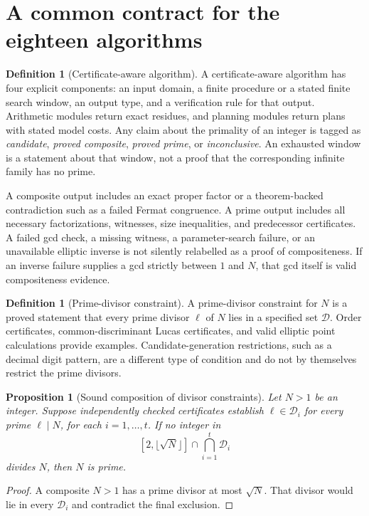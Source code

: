 \documentclass[11pt,a4paper]{article}
\newtheorem{proposition}[theorem]{Proposition}
\theoremstyle{definition}\newtheorem{definition}[theorem]{Definition}
\theoremstyle{remark}\newtheorem{remark}[theorem]{Remark}
\begin{document}
\section{A common contract for the eighteen algorithms}
\label{sec:algorithm-contract}

\begin{definition}[Certificate-aware algorithm]
A certificate-aware algorithm has four explicit components:
an input domain, a finite procedure or a stated finite search window,
an output type, and a verification rule for that output. Arithmetic modules
return exact residues, and planning modules return plans with stated model
costs. Any claim about the primality of an integer is tagged as
\emph{candidate}, \emph{proved composite}, \emph{proved prime}, or
\emph{inconclusive}. An exhausted window is a statement about that window,
not a proof that the corresponding infinite family has no prime.
\end{definition}

A composite output includes an exact proper factor or a theorem-backed
contradiction such as a failed Fermat congruence. A prime output includes
all necessary factorizations, witnesses, size inequalities, and predecessor
certificates. A failed gcd check, a missing witness, a parameter-search
failure, or an unavailable elliptic inverse is not silently relabelled as
a proof of compositeness. If an inverse failure supplies a gcd strictly
between $1$ and $N$, that gcd itself is valid compositeness evidence.

\begin{definition}[Prime-divisor constraint]
A prime-divisor constraint for $N$ is a proved statement that every prime
divisor $\ell$ of $N$ lies in a specified set $\mathcal D$. Order
certificates, common-discriminant Lucas certificates, and valid elliptic
point calculations provide examples. Candidate-generation restrictions,
such as a decimal digit pattern, are a different type of condition and do
not by themselves restrict the prime divisors.
\end{definition}

\begin{proposition}[Sound composition of divisor constraints]
Let $N>1$ be an integer. Suppose independently checked certificates establish
$\ell\in\mathcal D_i$ for every prime $\ell\mid N$, for each
$i=1,\ldots,t$. If no integer in
\[
 [2,\lfloor\sqrt N\rfloor]\cap\bigcap_{i=1}^t\mathcal D_i
\]
divides $N$, then $N$ is prime.
\end{proposition}
\begin{proof}
A composite $N>1$ has a prime divisor at most $\sqrt N$. That divisor
would lie in every $\mathcal D_i$ and contradict the final exclusion.
\end{proof}
\end{document}
